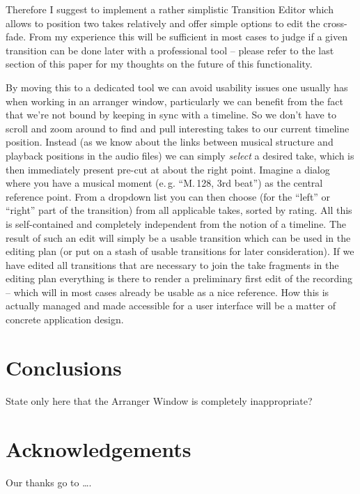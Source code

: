 \documentclass[11pt,a4paper]{article}
\begin{document}
Therefore I suggest to implement a rather simplistic Transition Editor which allows to position two takes relatively and offer simple options to edit the cross-fade.
From my experience this will be sufficient in most cases to judge if a given transition can be done later with a professional tool -- please refer to the last section of this paper for my thoughts on the future of this functionality.

By moving this to a dedicated tool we can avoid usability issues one usually has when working in an arranger window, particularly we can benefit from the fact that we're not bound by keeping in sync with a timeline.
So we don't have to scroll and zoom around to find and pull interesting takes to our current timeline position.
Instead (as we know about the links between musical structure and playback positions in the audio files) we can simply \emph{select} a desired take, which is then immediately present pre-cut at about the right point.
Imagine a dialog where you have a musical moment (e.\,g. “M.\,128, 3rd beat”) as the central reference point.
From a dropdown list you can then choose (for the “left” or “right” part of the transition) from all applicable takes, sorted by rating.
All this is self-contained and completely independent from the notion of a timeline.
The result of such an edit will simply be a usable transition which can be used in the editing plan (or put on a stash of usable transitions for later consideration).
If we have edited all transitions that are necessary to join the take fragments in the editing plan everything is there to render a preliminary first edit of the recording -- which will in most cases already be usable as a nice reference.
How this is actually managed and made accessible for a user interface will be a matter of concrete application design.



\section{Conclusions}

State only here that the Arranger Window is completely inappropriate?


\section{Acknowledgements}

Our thanks go to \ldots .
\end{document}
